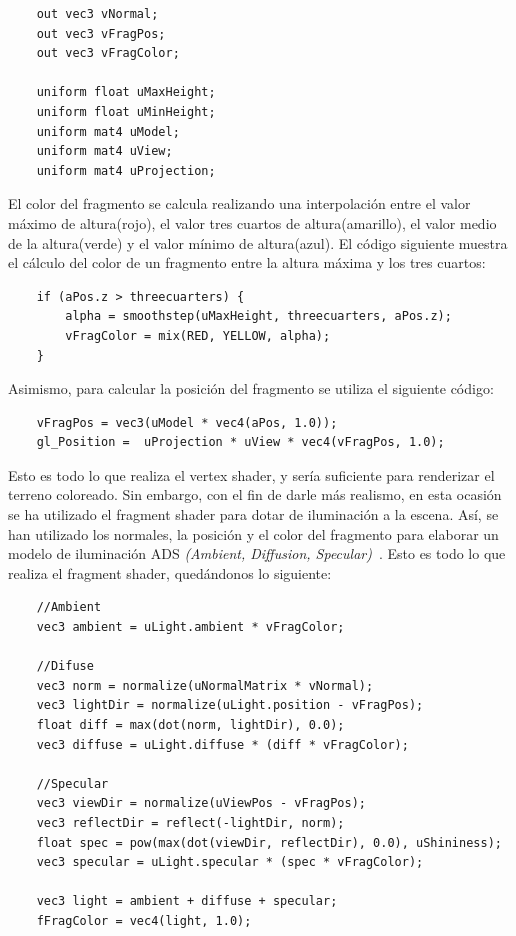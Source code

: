 \begin{verbatim}
    out vec3 vNormal;
    out vec3 vFragPos;
    out vec3 vFragColor;
    
    uniform float uMaxHeight;
    uniform float uMinHeight;
    uniform mat4 uModel;
    uniform mat4 uView;
    uniform mat4 uProjection;
\end{verbatim}

El color del fragmento se calcula realizando una interpolación entre el valor
máximo de altura(rojo), el valor tres cuartos de altura(amarillo), el valor
medio de la altura(verde) y el valor mínimo de altura(azul). El código siguiente
muestra el cálculo del color de un fragmento entre la altura máxima y los tres
cuartos:

\begin{verbatim}
    if (aPos.z > threecuarters) {
        alpha = smoothstep(uMaxHeight, threecuarters, aPos.z);	
        vFragColor = mix(RED, YELLOW, alpha);	
    }
\end{verbatim}

Asimismo, para calcular la posición del fragmento se utiliza el siguiente
código:

\begin{verbatim}		
    vFragPos = vec3(uModel * vec4(aPos, 1.0)); 
    gl_Position =  uProjection * uView * vec4(vFragPos, 1.0);
\end{verbatim}

Esto es todo lo que realiza el vertex shader, y sería suficiente para renderizar
el terreno coloreado. Sin embargo, con el fin de darle más realismo, en esta
ocasión se ha utilizado el fragment shader para dotar de iluminación a la
escena. Así, se han utilizado los normales, la posición y el color del fragmento
para elaborar un modelo de iluminación ADS \textit{(Ambient, Diffusion,
Specular)}~\cite{Bailey}. Esto es todo lo que realiza el fragment shader,
quedándonos lo siguiente:

\begin{verbatim}
    //Ambient
    vec3 ambient = uLight.ambient * vFragColor; 
    
    //Difuse
    vec3 norm = normalize(uNormalMatrix * vNormal);
    vec3 lightDir = normalize(uLight.position - vFragPos);
    float diff = max(dot(norm, lightDir), 0.0);
    vec3 diffuse = uLight.diffuse * (diff * vFragColor); 
    
    //Specular
    vec3 viewDir = normalize(uViewPos - vFragPos);
    vec3 reflectDir = reflect(-lightDir, norm); 
    float spec = pow(max(dot(viewDir, reflectDir), 0.0), uShininess);
    vec3 specular = uLight.specular * (spec * vFragColor);
    
    vec3 light = ambient + diffuse + specular;
    fFragColor = vec4(light, 1.0);
\end{verbatim}

